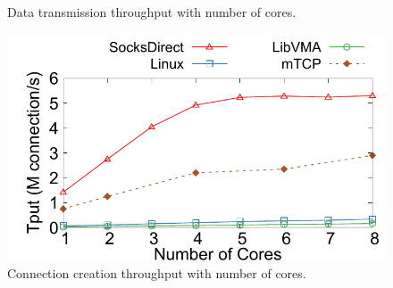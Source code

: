 \begin{figure}[t!]
\begin{minipage}{.31\textwidth}
		\caption{Data transmission throughput with number of cores.}
		\label{fig:eval-corenum-tput}
	\end{minipage}
	\hspace{0.01\textwidth}
	\begin{minipage}{.31\textwidth}
		\centering
		\includegraphics[width=\textwidth]{eval/microbenchmark/conn-setup-tput.pdf}
		\vspace{-10pt}
		\caption{Connection creation throughput with number of cores.}
		\label{fig:eval-conn-setup-tput}
		

\end{minipage}
\end{figure}

